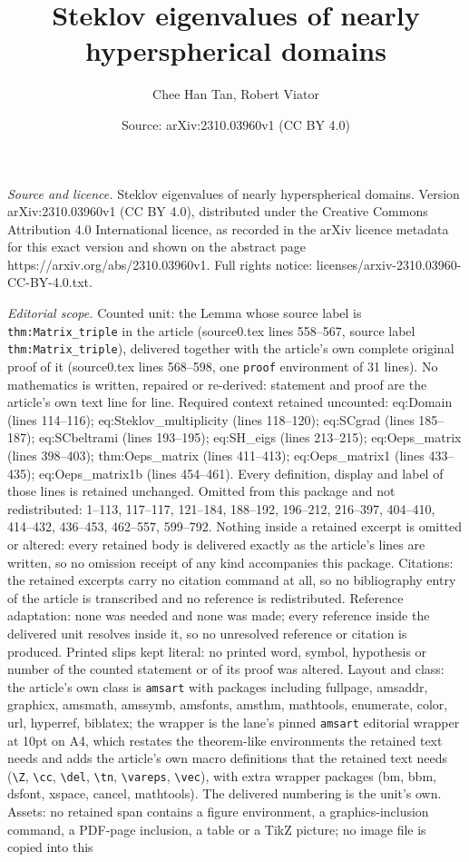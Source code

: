 \documentclass[10pt,a4paper]{amsart}
\title[Steklov eigenvalues of nearly hyperspherical domains]{Steklov eigenvalues of nearly hyperspherical domains}
\author{Chee Han Tan, Robert Viator}
\date{Source: arXiv:2310.03960v1 (CC BY 4.0)}
\begin{document}
\maketitle

\noindent\emph{Source and licence.} Steklov eigenvalues of nearly hyperspherical domains. Version arXiv:2310.03960v1 (CC BY 4.0), distributed under the Creative Commons Attribution 4.0 International licence, as recorded in the arXiv licence metadata for this exact version and shown on the abstract page https://arxiv.org/abs/2310.03960v1. Full rights notice: licenses/arxiv-2310.03960-CC-BY-4.0.txt.\par\smallskip

\noindent\textit{Editorial scope.} Counted unit: the Lemma whose source label is \texttt{thm:Matrix\_triple} in the article (source0.tex lines 558--567, source label \texttt{thm:Matrix\_triple}), delivered together with the article's own complete original proof of it (source0.tex lines 568--598, one \texttt{proof} environment of 31 lines). No mathematics is written, repaired or re-derived: statement and proof are the article's own text line for line. Required context retained uncounted: eq:Domain (lines 114--116); eq:Steklov\_multiplicity (lines 118--120); eq:SCgrad (lines 185--187); eq:SCbeltrami (lines 193--195); eq:SH\_eigs (lines 213--215); eq:Oeps\_matrix (lines 398--403); thm:Oeps\_matrix (lines 411--413); eq:Oeps\_matrix1 (lines 433--435); eq:Oeps\_matrix1b (lines 454--461). Every definition, display and label of those lines is retained unchanged. Omitted from this package and not redistributed: 1--113, 117--117, 121--184, 188--192, 196--212, 216--397, 404--410, 414--432, 436--453, 462--557, 599--792. Nothing inside a retained excerpt is omitted or altered: every retained body is delivered exactly as the article's lines are written, so no omission receipt of any kind accompanies this package. Citations: the retained excerpts carry no citation command at all, so no bibliography entry of the article is transcribed and no reference is redistributed. Reference adaptation: none was needed and none was made; every reference inside the delivered unit resolves inside it, so no unresolved reference or citation is produced. Printed slips kept literal: no printed word, symbol, hypothesis or number of the counted statement or of its proof was altered. Layout and class: the article's own class is \texttt{amsart} with packages including fullpage, amsaddr, graphicx, amsmath, amssymb, amsfonts, amsthm, mathtools, enumerate, color, url, hyperref, biblatex; the wrapper is the lane's pinned \texttt{amsart} editorial wrapper at 10pt on A4, which restates the theorem-like environments the retained text needs and adds the article's own macro definitions that the retained text needs (\texttt{\textbackslash Z}, \texttt{\textbackslash cc}, \texttt{\textbackslash del}, \texttt{\textbackslash tn}, \texttt{\textbackslash vareps}, \texttt{\textbackslash vec}), with extra wrapper packages (bm, bbm, dsfont, xspace, cancel, mathtools). The delivered numbering is the unit's own. Assets: no retained span contains a figure environment, a graphics-inclusion command, a PDF-page inclusion, a table or a TikZ picture; no image file is copied into this 
\end{document}
